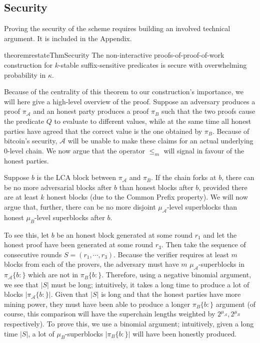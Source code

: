 \subsection{Security}

Proving the security of the scheme requires building an involved technical
argument. It is included in the Appendix.

\begin{restatable}{theorem}{restateThmSecurity}
    \label{thm.security}
    The non-interactive proofs-of-proof-of-work construction for $k$-stable
    suffix-sensitive predicates is secure with overwhelming probability in
    $\kappa$.
\end{restatable}

Because of the centrality of this theorem to our construction's importance, we
will here give a high-level overview of the proof. Suppose an adversary produces
a proof $\pi_\mathcal{A}$ and an honest party produces a proof $\pi_B$ such that
the two proofs cause the predicate $Q$ to evaluate to different values, while at
the same time all honest parties have agreed that the correct value is the one
obtained by $\pi_B$. Because of bitcoin's security, $\mathcal{A}$ will be unable
to make these claims for an actual underlying 0-level chain. We now argue that
the operator $\leq_m$ will signal in favour of the honest parties.

Suppose $b$ is the LCA block between $\pi_\mathcal{A}$ and $\pi_B$. If the chain
forks at $b$, there can be no more adversarial blocks after $b$ than honest
blocks after $b$, provided there are at least $k$ honest blocks (due to the
Common Prefix property). We will now argue that, further, there can be no more
disjoint $\mu_\mathcal{A}$-level superblocks than honest $\mu_B$-level
superblocks after $b$.

To see this, let $b$ be an honest block generated at some round $r_1$ and let
the honest proof have been generated at some round $r_3$. Then take the sequence
of consecutive rounds $S = (r_1, \cdots, r_3)$. Because the verifier requires at
least $m$ blocks from each of the provers, the adversary must have $m$
$\mu_\mathcal{A}$-superblocks in $\pi_\mathcal{A}\{b:\}$ which are not in
$\pi_B\{b:\}$. Therefore, using a negative binomial argument, we see that $|S|$
must be long; intuitively, it takes a long time to produce a lot of blocks
$|\pi_\mathcal{A}\{b:\}|$. Given that $|S|$ is long and that the honest parties
have more mining power, they must have been able to produce a longer
$\pi_B\{b:\}$ argument (of course, this comparison will have the superchain
lengths weighted by $2^{\mu_\mathcal{A}}, 2^{\mu_B}$ respectively). To prove
this, we use a binomial argument; intuitively, given a long time $|S|$, a lot of
$\mu_B$-superblocks $|\pi_B\{b:\}|$ will have been honestly produced.

